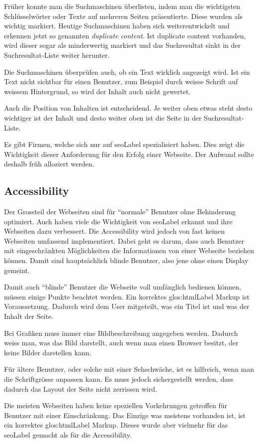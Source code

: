 Früher konnte man die Suchmaschinen überlisten, indem man die wichtigsten Schlüsselwörter oder Texte auf mehreren Seiten präsentierte. Diese wurden  als wichtig markiert. Heutige Suchmaschinen haben sich weiterentwickelt und erkennen jetzt so genannten \textit{duplicate content}. Ist duplicate content vorhanden, wird dieser sogar als minderwertig markiert und das Suchresultat sinkt in der Suchresultat-Liste weiter herunter.

Die Suchmaschinen überprüfen auch, ob ein Text wirklich angezeigt wird. Ist ein Text nicht sichtbar für einen Benutzer, zum Beispiel durch weisse Schrift auf weissem Hintergrund, so wird der Inhalt auch nicht gewertet.

Auch die Position von Inhalten ist entscheidend. Je weiter oben etwas steht desto wichtiger ist der Inhalt und desto weiter oben ist die Seite in der Suchresultat-Liste.

Es gibt Firmen, welche sich nur auf \gls{seoLabel} spezialisiert haben. Dies zeigt die Wichtigkeit dieser Anforderung für den Erfolg einer Webseite. Der Aufwand sollte deshalb früh alloziert werden.

\subsection{Accessibility}
Der Grossteil der Webseiten sind für "`normale"' Benutzer ohne Behinderung optimiert. Auch haben viele die Wichtigkeit von \gls{seoLabel} erkannt und ihre Webseiten dazu verbessert. Die Accessibility wird jedoch von fast keinen Webseiten umfassend implementiert. Dabei geht es darum, dass auch Benutzer mit eingeschränkten Möglichkeiten die Informationen von einer Webseite beziehen können. Damit sind hauptsächlich blinde Benutzer, also jene ohne einen Display gemeint.

Damit auch "`blinde"' Benutzer die Webseite voll umfänglich bedienen können, müssen einige Punkte beachtet werden. Ein korrektes \Gls{glos:htmlLabel} Markup ist Voraussetzung. Dadurch wird dem User mitgeteilt, was ein Titel ist und was der Inhalt der Seite.

Bei Grafiken muss immer eine Bildbeschreibung angegeben werden. Dadurch weiss man, was das Bild darstellt, auch wenn man einen Browser besitzt, der keine Bilder darstellen kann.

Für ältere Benutzer, oder solche mit einer Sehschwäche, ist es hilfreich, wenn man die Schriftgrösse anpassen kann. Es muss jedoch sichergestellt werden, dass dadurch das Layout der Seite nicht zerrissen wird.

Die meisten Webseiten haben keine speziellen Vorkehrungen getroffen für Benutzer mit einer Einschränkung. Das Einzige was meistens vorhanden ist, ist ein korrektes \Gls{glos:htmlLabel} Markup. Dieses wurde aber vielmehr für das \gls{seoLabel} gemacht als für die Accessibility.